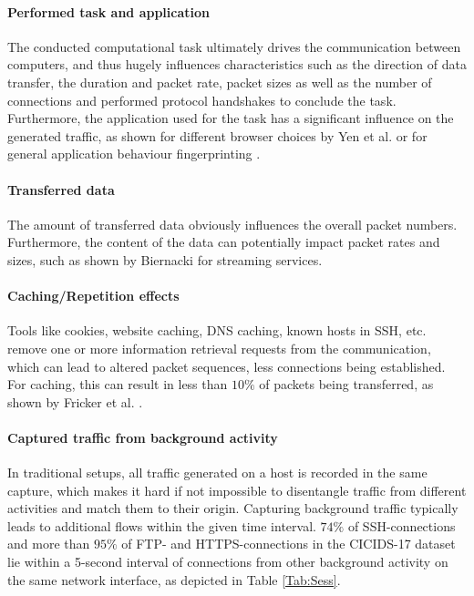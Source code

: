 \documentclass{article}
\begin{document}
\paragraph{Performed task and application}
The conducted computational task ultimately drives the communication between computers, and thus hugely influences characteristics such as the direction of data transfer, the duration and packet rate, packet sizes as well as the number of connections and performed protocol handshakes to conclude the task. Furthermore, the application used for the task has a significant influence on the generated traffic, as shown for different browser choices by Yen et al. \cite{yen2009browser} or for general application behaviour fingerprinting \cite{stober2013you}. 

\paragraph{Transferred data} 
The amount of transferred data obviously influences the overall packet numbers. Furthermore, the content of the data can potentially impact packet rates and sizes, such as shown by Biernacki \cite{biernacki2017analysis} for streaming services.




\paragraph{Caching/Repetition effects}
Tools like cookies, website caching, DNS caching, known hosts in SSH, etc. remove one or more information retrieval requests from the communication, which can lead to altered packet sequences, less connections being established. For caching, this can result in less than $10\%$ of packets being transferred, as shown by Fricker et al. \cite{fricker2012impact}. 


\paragraph{Captured traffic from background activity} 
In traditional setups, all traffic generated on a host is recorded in the same capture, which makes it hard if not impossible to disentangle traffic from different activities and match them to their origin. Capturing background traffic typically leads to additional flows within the given time interval. $74\%$ of SSH-connections and more than $95\%$ of FTP- and HTTPS-connections in the CICIDS-17 dataset lie within a 5-second interval of connections from other background activity on the same network interface, as depicted in Table \ref{Tab:Sess}.
\end{document}

